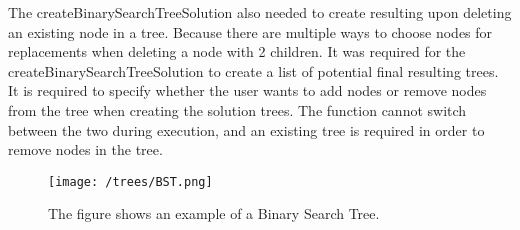 The createBinarySearchTreeSolution also needed to create resulting upon deleting an existing node in a tree. Because there are multiple ways to choose nodes for replacements when deleting a node with 2 children. It was required for the createBinarySearchTreeSolution to create a list of potential final resulting trees. It is required to specify whether the user wants to add nodes or remove nodes from the tree when creating the solution trees. The function cannot switch between the two during execution, and an existing tree is required in order to remove nodes in the tree.

\begin{figure}[h]
	\centering
	\texttt{[image: /trees/BST.png]}
	\caption{The figure shows an example of a Binary Search Tree.}	
	\label{fig:BST}
\end{figure}
